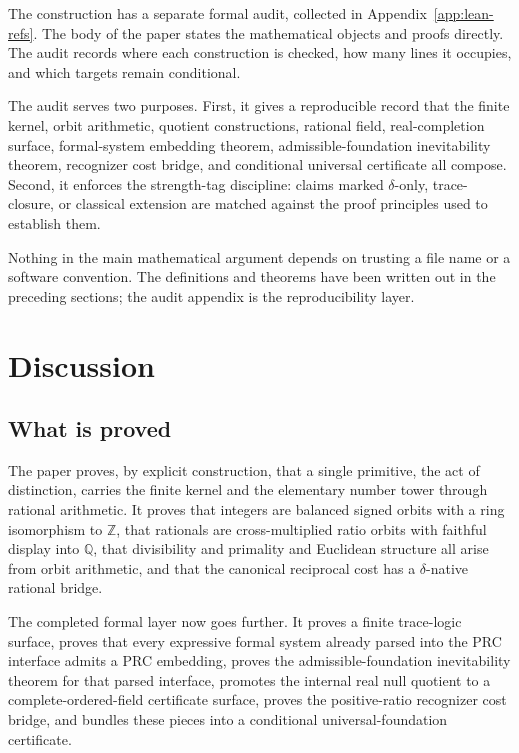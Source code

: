 \documentclass[11pt,a4paper]{article}
\theoremstyle{definition}
\theoremstyle{remark}
\begin{document}
The construction has a separate formal audit, collected in
Appendix~\ref{app:lean-refs}. The body of the paper states the mathematical
objects and proofs directly. The audit records where each construction is
checked, how many lines it occupies, and which targets remain conditional.

The audit serves two purposes. First, it gives a reproducible record that the
finite kernel, orbit arithmetic, quotient constructions, rational field,
real-completion surface, formal-system embedding theorem, admissible-foundation
inevitability theorem, recognizer cost bridge, and conditional universal
certificate all compose. Second, it enforces the strength-tag discipline:
claims marked $\delta$-only, trace-closure, or classical extension are matched
against the proof principles used to establish them.

Nothing in the main mathematical argument depends on trusting a file name or a
software convention. The definitions and theorems have been written out in the
preceding sections; the audit appendix is the reproducibility layer.

\section{Discussion}\label{sec:discussion}

\subsection{What is proved}

The paper proves, by explicit construction, that a single primitive, the act of
distinction, carries the finite kernel and the elementary number tower through
rational arithmetic. It proves that integers are balanced signed
orbits with a ring isomorphism to $\mathbb{Z}$, that rationals are
cross-multiplied ratio orbits with faithful display into $\mathbb{Q}$, that
divisibility and primality and Euclidean structure all arise from orbit
arithmetic, and that the canonical reciprocal cost has a $\delta$-native
rational bridge.

The completed formal layer now goes further. It proves a finite trace-logic
surface, proves that every expressive formal system already parsed into the
PRC interface admits a PRC embedding, proves the admissible-foundation
inevitability theorem for that parsed interface, promotes the internal real
null quotient to a complete-ordered-field certificate surface, proves the
positive-ratio recognizer cost bridge, and bundles these pieces into a
conditional universal-foundation certificate.
\end{document}

